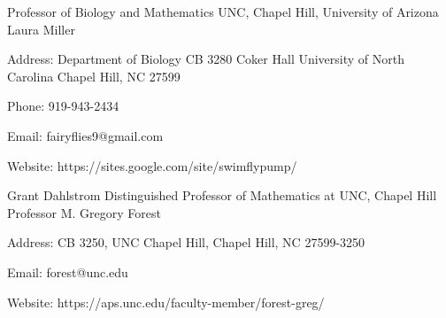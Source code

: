 
  \cventry
    {Professor of Biology and Mathematics UNC, Chapel Hill, University of Arizona} %
    {Laura Miller} %
    {} %
    {} %
    {
      \begin{cvitems} %
        \item {Address: Department of Biology CB 3280 Coker Hall University of North Carolina Chapel Hill, NC 27599}
        \item {Phone: 919-943-2434}
        \item {Email: fairyflies9@gmail.com }
        \item {Website: https://sites.google.com/site/swimflypump/}
      \end{cvitems}
    }

\cventry
    {Grant Dahlstrom Distinguished Professor of Mathematics at UNC, Chapel Hill} %
    {Professor M. Gregory Forest} %
    {} %
    {} %
    {
      \begin{cvitems} %
        \item {Address: CB 3250, UNC Chapel Hill, Chapel Hill, NC 27599-3250}
        \item {Email: forest@unc.edu }
        \item {Website: https://aps.unc.edu/faculty-member/forest-greg/}
      \end{cvitems}
    }
